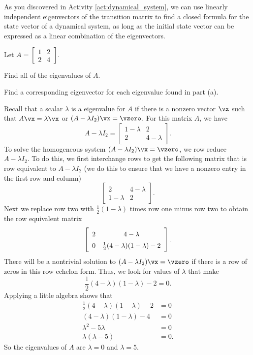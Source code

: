 \begin{activity}
\ea

\end{activity}

As you discovered in Activity \ref{act:dynamical_system}, we can use linearly independent eigenvectors of the transition matrix to find a closed formula for the state vector of a dynamical system, as long as the initial state vector can be expressed as a linear combination of the eigenvectors.


\label{sec:eigen_exam}

\ExampleIntro

\begin{example} Let $A = \left[ \begin{array}{cc} 1&2\\2&4 \end{array} \right]$.
	\ba
	\item Find all of the eigenvalues of $A$.
	
	\item Find a corresponding eigenvector for each eigenvalue found in part (a).  
	
	\ea


\ExampleSolution
\ba

\item Recall that a scalar $\lambda$ is a eigenvalue for $A$ if there is a nonzero vector $\vx$ such that $A \vx = \lambda \vx$ or $(A-\lambda I_2) \vx = \vzero$. For this matrix $A$, we have 
\[A - \lambda I_2 = \left[ \begin{array}{cc} 1-\lambda&2\\2&4-\lambda \end{array} \right].\]
To solve the homogeneous system $(A-\lambda I_2) \vx = \vzero$, we row reduce $A - \lambda I_2$. To do this, we first interchange rows to get the following matrix that is row equivalent to $A - \lambda I_2$ (we do this to ensure that we have a nonzero entry in the first row and column)
\[\left[ \begin{array}{cc} 2&4-\lambda \\ 1-\lambda&2 \end{array} \right].\]
Next we replace row two with $\frac{1}{2}(1-\lambda)$ times row one minus row two to obtain the row equivalent matrix
\[\left[ \renewcommand{\arraystretch}{1.4} \begin{array}{cc} 2&4-\lambda \\ 0&\frac{1}{2}(4-\lambda)(1-\lambda)-2 \\ \end{array} \right].\]
There will be a nontrivial solution to $(A-\lambda I_2)\vx = \vzero$ if there is a row of zeros in this row echelon form. Thus, we look for values of $\lambda$ that make 
\[\frac{1}{2}(4-\lambda)(1-\lambda)-2 = 0.\]
Applying a little algebra shows that 
\begin{align*}
\frac{1}{2}(4-\lambda)(1-\lambda)-2 &= 0 \\
(4-\lambda)(1-\lambda) - 4 &= 0 \\
\lambda^2 - 5 \lambda &= 0 \\
\lambda(\lambda-5) &= 0.
\end{align*}
So the eigenvalues of $A$ are $\lambda = 0$ and $\lambda = 5$. 


\end{example}
